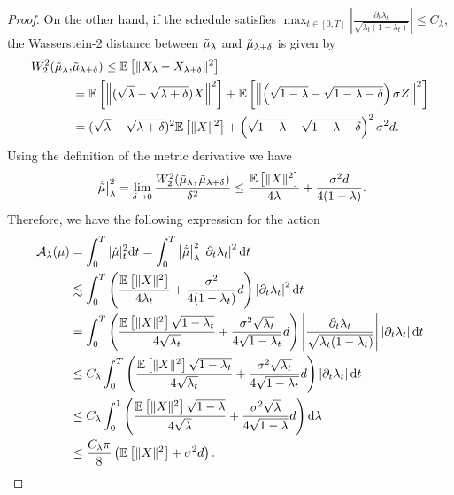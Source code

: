 \begin{proof}
On the other hand, if the schedule satisfies $\max_{t\in[0,T]}\left\vert \frac{\partial_t{\lambda_t}}{\sqrt{\lambda_t(1-\lambda_t)}}\right\vert \leq C_\lambda$, the Wasserstein-2 distance between $\Tilde{\mu}_\lambda$ and $\Tilde{\mu}_{\lambda+\delta}$ is given by
\begin{align*}
     W_2^2(\Tilde{\mu}_\lambda, &\Tilde{\mu}_{\lambda+\delta}) \leq \mathbb{E}\left[\Vert X_\lambda-X_{\lambda + \delta}\Vert^2\right]\\
&=\mathbb{E}\left[\left\Vert(\sqrt{\lambda}-\sqrt{\lambda+\delta})X\right\Vert^2\right] + \mathbb{E}\left[\left\Vert\left(\sqrt{1-\lambda}-\sqrt{1-\lambda-\delta}\right)\sigma Z\right\Vert^2\right]\\
&= (\sqrt{\lambda}-\sqrt{\lambda+\delta})^2 \mathbb{E}\left[\Vert X\Vert^2\right] + \left(\sqrt{1-\lambda}-\sqrt{1-\lambda-\delta}\right)^2\sigma^2d.
\end{align*}
Using the definition of the metric derivative we have
\begin{align*}
    \left\vert\Dot{\Tilde{\mu}}\right\vert_\lambda^2 = \lim_{\delta\to 0}\frac{ W_2^2(\Tilde{\mu}_\lambda, \Tilde{\mu}_{\lambda+\delta})}{\delta^2} \leq \frac{\mathbb{E}\left[\Vert X\Vert^2\right]}{4\lambda} + \frac{\sigma^2d}{4(1-\lambda)}.
\end{align*}
Therefore, we have the following expression for the action
\begin{align}
    \mathcal{A}_{\lambda}(\mu) &= \int_0^T \vert\Dot{\mu}\vert_t^2 \mathrm{d} t = \int_0^T \left\vert\Dot{\Tilde{\mu}}\right\vert_\lambda^2\left\vert\partial_t{\lambda_t}\right\vert^2 \mathrm{d} t\nonumber\\
    &\lesssim \int_0^T \left(\frac{\mathbb{E}\left[\Vert X\Vert^2\right]}{4 \lambda_t} + \frac{\sigma^2}{4(1-\lambda_t)}d\right)\left\vert \partial_t{\lambda_t}\right\vert^2\mathrm{d} t \nonumber\\
    &= \int_0^T \left(\frac{\mathbb{E}\left[\Vert X\Vert^2\right]\sqrt{1-\lambda_t}}{4\sqrt{\lambda_t}} + \frac{\sigma^2\sqrt{\lambda_t}}{4\sqrt{1-\lambda_t}}d\right)\left\vert \frac{\partial_t{\lambda_t}}{\sqrt{\lambda_t(1-\lambda_t)}}\right\vert \left\vert \partial_t{\lambda_t}\right\vert\mathrm{d} t \nonumber\\    
    &\leq C_\lambda \int_0^T \left(\frac{\mathbb{E}\left[\Vert X\Vert^2\right]\sqrt{1-\lambda_t}}{4\sqrt{\lambda_t}} +\frac{\sigma^2\sqrt{\lambda_t}}{4\sqrt{1-\lambda_t}}d\right) \left\vert \partial_t{\lambda_t}\right\vert\mathrm{d} t \nonumber\\ 
    &\leq C_\lambda \int_{0}^{1} \left(\frac{\mathbb{E}\left[\Vert X\Vert^2\right]\sqrt{1-\lambda}}{4\sqrt{\lambda}} + \frac{\sigma^2\sqrt{\lambda}}{4\sqrt{1-\lambda}} d\right) \mathrm{d} \lambda \nonumber\\
    &\leq \frac{C_\lambda\pi}{8} \left(\mathbb{E}\left[\Vert X\Vert^2\right] + \sigma^2 d\right).\nonumber
\end{align}
\end{proof}